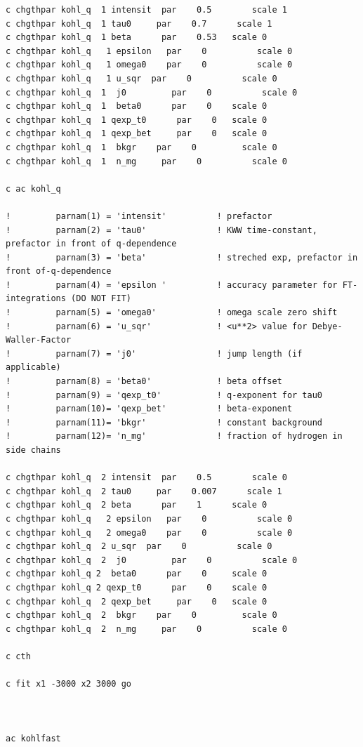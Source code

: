 \documentclass[11pt,fleqn]{book} %
\begin{document}
\begin{verbatim}
c chgthpar kohl_q  1 intensit  par    0.5        scale 1      
c chgthpar kohl_q  1 tau0     par    0.7      scale 1
c chgthpar kohl_q  1 beta      par    0.53 	 scale 0
c chgthpar kohl_q   1 epsilon   par    0          scale 0
c chgthpar kohl_q   1 omega0    par    0          scale 0
c chgthpar kohl_q   1 u_sqr  par    0          scale 0
c chgthpar kohl_q  1  j0         par    0          scale 0
c chgthpar kohl_q  1  beta0      par    0 	 scale 0
c chgthpar kohl_q  1 qexp_t0      par    0 	 scale 0
c chgthpar kohl_q  1 qexp_bet     par    0 	 scale 0
c chgthpar kohl_q  1  bkgr    par    0         scale 0
c chgthpar kohl_q  1  n_mg     par    0          scale 0

c ac kohl_q

! 		  parnam(1) = 'intensit'          ! prefactor
!         parnam(2) = 'tau0'              ! KWW time-constant, prefactor in front of q-dependence
!         parnam(3) = 'beta'              ! streched exp, prefactor in front of-q-dependence
!         parnam(4) = 'epsilon '          ! accuracy parameter for FT-integrations (DO NOT FIT)
!         parnam(5) = 'omega0'            ! omega scale zero shift
!         parnam(6) = 'u_sqr'             ! <u**2> value for Debye-Waller-Factor
!         parnam(7) = 'j0'                ! jump length (if applicable)
!         parnam(8) = 'beta0'             ! beta offset
!         parnam(9) = 'qexp_t0'           ! q-exponent for tau0
!         parnam(10)= 'qexp_bet'          ! beta-exponent 
!         parnam(11)= 'bkgr'              ! constant background 
!     	  parnam(12)= 'n_mg'              ! fraction of hydrogen in side chains

c chgthpar kohl_q  2 intensit  par    0.5        scale 0  
c chgthpar kohl_q  2 tau0     par    0.007      scale 1
c chgthpar kohl_q  2 beta      par    1 	 scale 0
c chgthpar kohl_q   2 epsilon   par    0          scale 0
c chgthpar kohl_q   2 omega0    par    0          scale 0
c chgthpar kohl_q  2 u_sqr  par    0          scale 0
c chgthpar kohl_q  2  j0         par    0          scale 0
c chgthpar kohl_q 2  beta0      par    0 	 scale 0
c chgthpar kohl_q 2 qexp_t0      par    0 	 scale 0
c chgthpar kohl_q  2 qexp_bet     par    0 	 scale 0
c chgthpar kohl_q  2  bkgr    par    0         scale 0
c chgthpar kohl_q  2  n_mg     par    0          scale 0

c cth

c fit x1 -3000 x2 3000 go



ac kohlfast


\end{verbatim}
\end{document}
